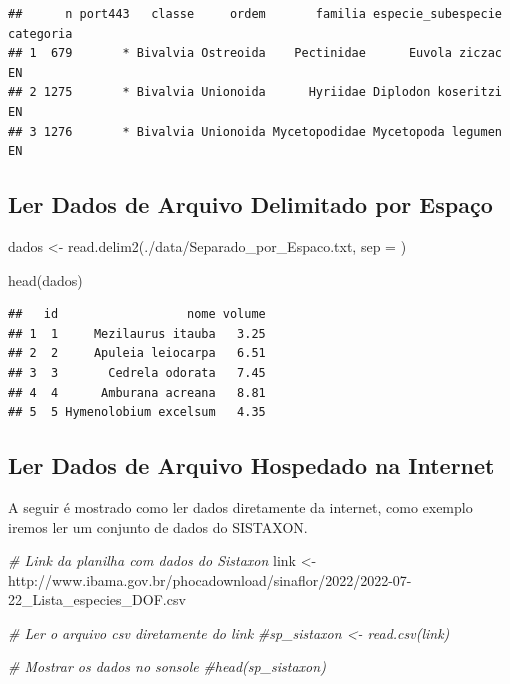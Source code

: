 \documentclass[
]{article}
\newenvironment{Shaded}{\begin{snugshade}}{\end{snugshade}}
\newcommand{\AttributeTok}[1]{\textcolor[rgb]{0.77,0.63,0.00}{#1}}
\newcommand{\CommentTok}[1]{\textcolor[rgb]{0.56,0.35,0.01}{\textit{#1}}}
\newcommand{\FunctionTok}[1]{\textcolor[rgb]{0.00,0.00,0.00}{#1}}
\newcommand{\NormalTok}[1]{#1}
\newcommand{\OtherTok}[1]{\textcolor[rgb]{0.56,0.35,0.01}{#1}}
\newcommand{\StringTok}[1]{\textcolor[rgb]{0.31,0.60,0.02}{#1}}
\begin{document}
\begin{verbatim}
##      n port443   classe     ordem       familia especie_subespecie categoria
## 1  679       * Bivalvia Ostreoida    Pectinidae      Euvola ziczac        EN
## 2 1275       * Bivalvia Unionoida      Hyriidae Diplodon koseritzi        EN
## 3 1276       * Bivalvia Unionoida Mycetopodidae Mycetopoda legumen        EN
\end{verbatim}

\hypertarget{ler-dados-de-arquivo-delimitado-por-espauxe7o}{%
\subsection{Ler Dados de Arquivo Delimitado por
Espaço}\label{ler-dados-de-arquivo-delimitado-por-espauxe7o}}

\begin{Shaded}
\begin{Highlighting}[]
\NormalTok{dados }\OtherTok{\textless{}{-}} \FunctionTok{read.delim2}\NormalTok{(}\StringTok{\textquotesingle{}./data/Separado\_por\_Espaco.txt\textquotesingle{}}\NormalTok{, }\AttributeTok{sep =} \StringTok{\textquotesingle{} \textquotesingle{}}\NormalTok{)}

\FunctionTok{head}\NormalTok{(dados)}
\end{Highlighting}
\end{Shaded}

\begin{verbatim}
##   id                  nome volume
## 1  1     Mezilaurus itauba   3.25
## 2  2     Apuleia leiocarpa   6.51
## 3  3       Cedrela odorata   7.45
## 4  4      Amburana acreana   8.81
## 5  5 Hymenolobium excelsum   4.35
\end{verbatim}

\hypertarget{ler-dados-de-arquivo-hospedado-na-internet}{%
\subsection{Ler Dados de Arquivo Hospedado na
Internet}\label{ler-dados-de-arquivo-hospedado-na-internet}}

A seguir é mostrado como ler dados diretamente da internet, como exemplo
iremos ler um conjunto de dados do SISTAXON.

\begin{Shaded}
\begin{Highlighting}[]
\CommentTok{\# Link da planilha com dados do Sistaxon}
\NormalTok{link }\OtherTok{\textless{}{-}} \StringTok{\textquotesingle{}http://www.ibama.gov.br/phocadownload/sinaflor/2022/2022{-}07{-}22\_Lista\_especies\_DOF.csv\textquotesingle{}}

\CommentTok{\# Ler o arquivo csv diretamente do link}
\CommentTok{\#sp\_sistaxon \textless{}{-} read.csv(link)}

\CommentTok{\# Mostrar os dados no sonsole}
\CommentTok{\#head(sp\_sistaxon)}
\end{Highlighting}
\end{Shaded}
\end{document}
